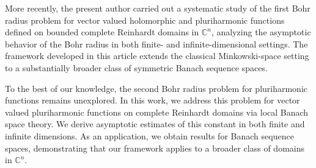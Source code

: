 \documentclass[a4paper,11pt, reqno]{amsart}
\theoremstyle{definition}
\begin{document}
	More recently, the present author \cite{Himadri-local-Banach-1} carried out a systematic study of the first Bohr radius problem for vector valued holomorphic and pluriharmonic functions defined on bounded complete Reinhardt domains in $\mathbb{C}^n$, analyzing the asymptotic behavior of the Bohr radius in both finite- and infinite-dimensional settings. The framework developed in this article extends the classical Minkowski-space setting to a substantially broader class of symmetric Banach sequence spaces.
	\vspace{1mm}
	
	To the best of our knowledge, the second Bohr radius problem for pluriharmonic functions remains unexplored. In this work, we address this problem for vector valued pluriharmonic functions on complete Reinhardt domains via local Banach space theory. We derive asymptotic estimates of this constant in both finite and infinite dimensions. As an application, we obtain results for Banach sequence spaces, demonstrating that our framework applies to a broader class of domains in $\mathbb{C}^n$. 
	\vspace{1mm}
	
\end{document}
